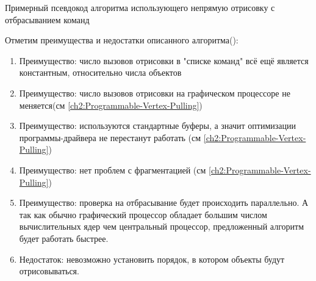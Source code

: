 	\begin{algorithm} %
		\nonl{}
		\caption{Примерный псевдокод алгоритма использующего непрямую отрисовку с отбрасыванием команд}\label{alg:IndirectWithCull}
	\end{algorithm}
	\FloatBarrier
	
	Отметим преимущества и недостатки описанного алгоритма():
	\begin{enumerate}[1.] 
		\item Преимущество: число вызовов отрисовки в "списке команд" всё ещё является константным, относительно числа объектов
		\item Преимущество: число вызовов отрисовки на графическом процессоре не меняется(см \ref{ch2:Programmable-Vertex-Pulling})
		\item Преимущество: используются стандартные буферы, а значит оптимизации программы-драйвера не перестанут работать (см \ref{ch2:Programmable-Vertex-Pulling})
		\item Преимущество: нет проблем с фрагментацией (см \ref{ch2:Programmable-Vertex-Pulling})
		\item Преимущество: проверка на отбрасывание будет происходить параллельно. А так как обычно графический процессор обладает большим числом вычислительных ядер чем центральный процессор, предложенный алгоритм будет работать быстрее.
		\item Недостаток: невозможно установить порядок, в котором объекты будут отрисовываться.
	\end{enumerate}
		
